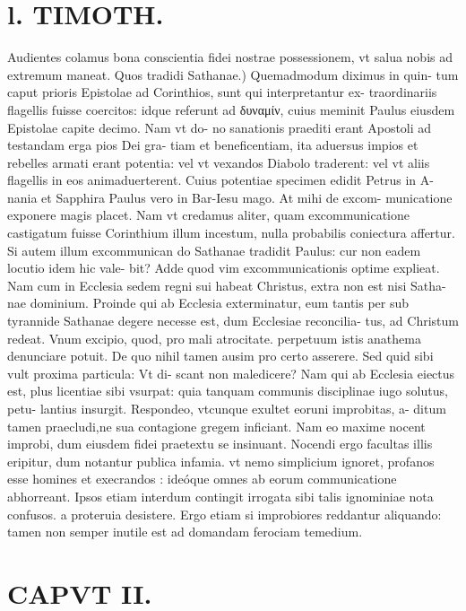 \documentclass{article}
\begin{document}
\begin{pages}
\section*{l. TIMOTH. }
\marginpar{[ p.16 ]}\pstart Audientes colamus bona conscientia fidei nostrae possessionem, vt salua nobis ad extremum maneat.  \pend\pstart Quos tradidi Sathanae.) Quemadmodum diximus in quin- tum caput prioris Epistolae ad Corinthios, sunt qui interpretantur ex- traordinariis flagellis fuisse coercitos: idque referunt ad δυναμίν, cuius meminit Paulus eiusdem Epistolae capite decimo. Nam vt do- no sanationis praediti erant Apostoli ad testandam erga pios Dei gra- tiam et beneficentiam, ita aduersus impios et rebelles armati erant potentia: vel vt vexandos Diabolo traderent: vel vt aliis flagellis in eos animaduerterent. Cuius potentiae specimen edidit Petrus in A- nania et Sapphira Paulus vero in Bar-Iesu mago. At mihi de excom- municatione exponere magis placet. Nam vt credamus aliter, quam excommunicatione castigatum fuisse Corinthium illum incestum, nulla probabilis coniectura affertur. Si autem illum excommunican do Sathanae tradidit Paulus: cur non eadem locutio idem hic vale- bit? Adde quod vim excommunicationis optime explieat. Nam cum in Ecclesia sedem regni sui habeat Christus, extra non est nisi Satha- nae dominium. Proinde qui ab Ecclesia exterminatur, eum tantis per sub tyrannide Sathanae degere necesse est, dum Ecclesiae reconcilia- tus, ad Christum redeat. Vnum excipio, quod, pro mali atrocitate. perpetuum istis anathema denunciare potuit. De quo nihil tamen ausim pro certo asserere. Sed quid sibi vult proxima particula: Vt di- scant non maledicere? Nam qui ab Ecclesia eiectus est, plus licentiae sibi vsurpat: quia tanquam communis disciplinae iugo solutus, petu- lantius insurgit. Respondeo, vtcunque exultet eoruni improbitas, a- ditum tamen praecludi,ne sua contagione gregem inficiant. Nam eo maxime nocent improbi, dum eiusdem fidei praetextu se insinuant. Nocendi ergo facultas illis eripitur, dum notantur publica infamia. vt nemo simplicium ignoret, profanos esse homines et execrandos : ideóque omnes ab eorum communicatione abhorreant. Ipsos etiam interdum contingit irrogata sibi talis ignominiae nota confusos. a proteruia desistere. Ergo etiam si improbiores reddantur aliquando: tamen non semper inutile est ad domandam ferociam temedium.  \pend
\endnumbering\beginnumbering\section{CAPVT II.}
{}

\end{pages}
\end{document}
